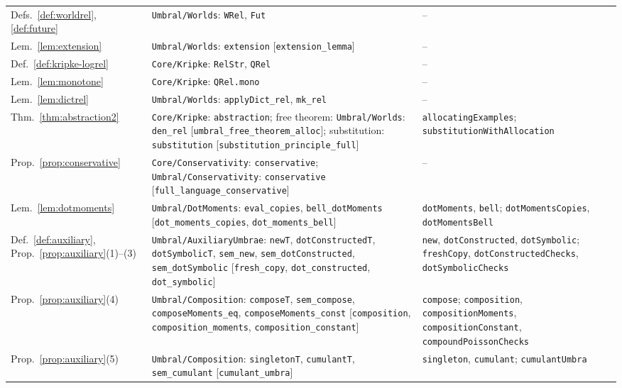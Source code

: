 \documentclass[11pt,a4paper]{report}
\theoremstyle{plain}
\theoremstyle{definition}
\theoremstyle{remark}
\begin{document}
{\begin{longtable}{@{}>{\raggedright\arraybackslash}p{2.4cm}>{\raggedright\arraybackslash}p{6.1cm}>{\raggedright\arraybackslash}p{4.9cm}@{}}
Defs.~\ref{def:worldrel}, \ref{def:future} & \texttt{Umbral/Worlds}: \texttt{WRel}, \texttt{Fut} & -- \\
Lem.~\ref{lem:extension} & \texttt{Umbral/Worlds}: \texttt{extension} [\texttt{extension\_lemma}] & -- \\
Def.~\ref{def:kripke-logrel} & \texttt{Core/Kripke}: \texttt{RelStr}, \texttt{QRel} & -- \\
Lem.~\ref{lem:monotone} & \texttt{Core/Kripke}: \texttt{QRel.mono} & -- \\
Lem.~\ref{lem:dictrel} & \texttt{Umbral/Worlds}: \texttt{applyDict\_rel}, \texttt{mk\_rel} & -- \\
Thm.~\ref{thm:abstraction2} & \texttt{Core/Kripke}: \texttt{abstraction}; free theorem: \texttt{Umbral/Worlds}: \texttt{den\_rel} [\texttt{umbral\_free\_theorem\_alloc}]; substitution: \texttt{substitution} [\texttt{substitution\_principle\_full}] & \texttt{allocatingExamples}; \texttt{substitutionWithAllocation} \\
Prop.~\ref{prop:conservative} & \texttt{Core/Conservativity}: \texttt{conservative}; \texttt{Umbral/Conservativity}: \texttt{conservative} [\texttt{full\_language\_conservative}] & -- \\
Lem.~\ref{lem:dotmoments} & \texttt{Umbral/DotMoments}: \texttt{eval\_copies}, \texttt{bell\_dotMoments} [\texttt{dot\_moments\_copies}, \texttt{dot\_moments\_bell}] & \texttt{dotMoments}, \texttt{bell}; \texttt{dotMomentsCopies}, \texttt{dotMomentsBell} \\
Def.~\ref{def:auxiliary}, Prop.~\ref{prop:auxiliary}(1)--(3) & \texttt{Umbral/AuxiliaryUmbrae}: \texttt{newT}, \texttt{dotConstructedT}, \texttt{dotSymbolicT}, \texttt{sem\_new}, \texttt{sem\_dotConstructed}, \texttt{sem\_dotSymbolic} [\texttt{fresh\_copy}, \texttt{dot\_constructed}, \texttt{dot\_symbolic}] & \texttt{new}, \texttt{dotConstructed}, \texttt{dotSymbolic}; \texttt{freshCopy}, \texttt{dotConstructedChecks}, \texttt{dotSymbolicChecks} \\
Prop.~\ref{prop:auxiliary}(4) & \texttt{Umbral/Composition}: \texttt{composeT}, \texttt{sem\_compose}, \texttt{composeMoments\_eq}, \texttt{composeMoments\_const} [\texttt{composition}, \texttt{composition\_moments}, \texttt{composition\_constant}] & \texttt{compose}; \texttt{composition}, \texttt{compositionMoments}, \texttt{compositionConstant}, \texttt{compoundPoissonChecks} \\
Prop.~\ref{prop:auxiliary}(5) & \texttt{Umbral/Composition}: \texttt{singletonT}, \texttt{cumulantT}, \texttt{sem\_cumulant} [\texttt{cumulant\_umbra}] & \texttt{singleton}, \texttt{cumulant}; \texttt{cumulantUmbra} \\

\end{longtable}}
\end{document}
